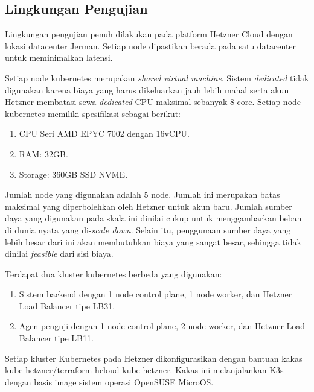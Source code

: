 \subsection{Lingkungan Pengujian}

Lingkungan pengujian penuh dilakukan pada platform Hetzner Cloud dengan lokasi datacenter Jerman. Setiap node dipastikan berada pada satu datacenter untuk meminimalkan latensi.

Setiap node kubernetes merupakan \textit{shared virtual machine}. Sistem \textit{dedicated} tidak digunakan karena biaya yang harus dikeluarkan jauh lebih mahal serta akun Hetzner membatasi sewa \textit{dedicated} CPU maksimal sebanyak 8 core. Setiap node kubernetes memiliki spesifikasi sebagai berikut:

\begin{enumerate}
    \item CPU Seri AMD EPYC 7002 dengan 16vCPU.
    \item RAM: 32GB.
    \item Storage: 360GB SSD NVME.
\end{enumerate}

Jumlah node yang digunakan adalah 5 node. Jumlah ini merupakan batas maksimal yang diperbolehkan oleh Hetzner untuk akun baru. Jumlah sumber daya yang digunakan pada skala ini dinilai cukup untuk menggambarkan beban di dunia nyata yang di-\textit{scale down}. Selain itu, penggunaan sumber daya yang lebih besar dari ini akan membutuhkan biaya yang sangat besar, sehingga tidak dinilai \textit{feasible} dari sisi biaya.

Terdapat dua kluster kubernetes berbeda yang digunakan:

\begin{enumerate}
    \item Sistem backend dengan 1 node control plane, 1 node worker, dan Hetzner Load Balancer tipe LB31.
    \item Agen penguji dengan 1 node control plane, 2 node worker, dan Hetzner Load Balancer tipe LB11.
\end{enumerate}

Setiap kluster Kubernetes pada Hetzner dikonfigurasikan dengan bantuan kakas kube-hetzner/terraform-hcloud-kube-hetzner. Kakas ini melanjalankan K3s dengan basis image sistem operasi OpenSUSE MicroOS.